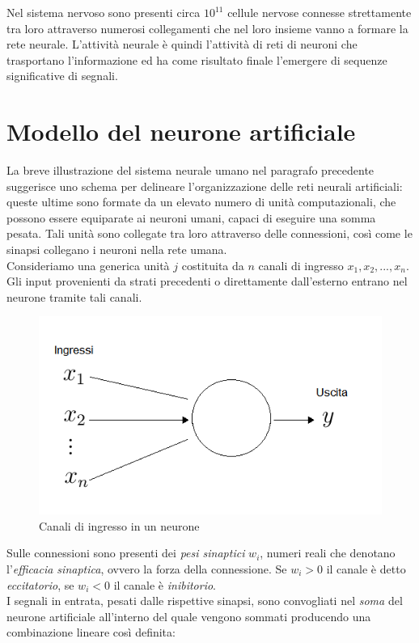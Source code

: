 \documentclass[12pt,a4paper,oneside]{book}
\begin{document}
	 	 Nel sistema nervoso sono presenti circa $10^{11}$ cellule nervose connesse strettamente tra loro attraverso numerosi collegamenti che nel loro insieme vanno a formare la rete neurale. L'attività neurale è quindi l'attività di reti di neuroni che trasportano l'informazione ed ha come risultato finale l'emergere di sequenze significative di segnali.\\
	 	
	 	
	\section{Modello del neurone artificiale}
		
		La breve illustrazione del sistema neurale umano nel paragrafo precedente suggerisce uno schema per delineare l'organizzazione delle reti neurali artificiali: queste ultime sono formate da un elevato numero di unità computazionali, che possono essere equiparate ai neuroni umani, capaci di eseguire una somma pesata. Tali unità sono collegate tra loro attraverso delle connessioni, così come le sinapsi collegano i neuroni nella rete umana. \\
		Consideriamo una generica unità $j$ costituita da $n$ canali di ingresso $x_{1}, x_{2}, ... ,x_{n}$.
		Gli input provenienti da strati precedenti o direttamente dall'esterno entrano nel neurone tramite tali canali.

		\begin{figure}[h!]
			\centering
			\includegraphics[width=0.7\linewidth]{IMMAGINI/palla1}
			\caption{Canali di ingresso in un neurone}
			\label{fig:palla1}
		\end{figure}
		
		Sulle connessioni sono presenti dei \emph{pesi sinaptici} $w_{i}$, numeri reali che denotano l'\emph{efficacia sinaptica}, ovvero la forza della connessione. Se $w_{i}>0$ il canale è detto \emph{eccitatorio}, se $w_{i}<0$ il canale è \emph{inibitorio}.\\
		I segnali in entrata, pesati dalle rispettive sinapsi, sono convogliati nel \emph{soma} del neurone artificiale all'interno del quale vengono sommati producendo una combinazione lineare così definita:
		
\end{document}
